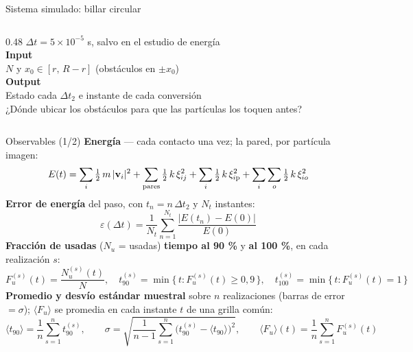 \begin{frame}{Sistema simulado: billar circular}
\begin{columns}[c]
\begin{column}{0.48\textwidth}
{      $\Delta t = 5\times10^{-5}$ s, salvo en el estudio de energía\\[5pt]
      \textbf{Input}\\[2pt]
      $N$ y $x_0 \in [r,\, R - r]$ (obstáculos en $\pm x_0$)\\[5pt]
      \textbf{Output}\\[2pt]
      Estado cada $\Delta t_2$ e instante de cada conversión\\[5pt]
      ¿Dónde ubicar los obstáculos para que las partículas los toquen antes?
      }
    \end{column}
  \end{columns}
\end{frame}

\begin{frame}{Observables (1/2)}
  \footnotesize
  \abovedisplayskip=0pt \belowdisplayskip=0pt
  \abovedisplayshortskip=0pt \belowdisplayshortskip=0pt
  \textbf{Energía} --- cada contacto una vez; la pared, por partícula imagen:
  \[
    E(t) = \sum_i \tfrac{1}{2}\,m\,|\mathbf{v}_i|^2 + \sum_{\text{pares}} \tfrac{1}{2}\,k\,\xi_{ij}^2
         + \sum_i \tfrac{1}{2}\,k\,\xi_{i\mathrm{p}}^2 + \sum_i \sum_o \tfrac{1}{2}\,k\,\xi_{io}^2
  \]
  \textbf{Error de energía} del paso, con $t_n = n\,\Delta t_2$ y $N_t$ instantes:
  \[
    \varepsilon(\Delta t) = \frac{1}{N_t} \sum_{n=1}^{N_t} \frac{|E(t_n) - E(0)|}{E(0)}
  \]
  \textbf{Fracción de usadas} ($N_u$ = usadas) \textbf{tiempo al 90 \%} y \textbf{al 100 \%}, en cada realización $s$:
  \[
    F_u^{(s)}(t) = \frac{N_u^{(s)}(t)}{N},
    \quad
    t_{90}^{(s)} = \min\big\{\, t : F_u^{(s)}(t) \geq 0{,}9 \,\big\},
    \quad
    t_{100}^{(s)} = \min\big\{\, t : F_u^{(s)}(t) = 1 \,\big\}
  \]
  \textbf{Promedio y desvío estándar muestral} sobre $n$ realizaciones (barras de error $= \sigma$); $\langle F_u \rangle$ se promedia en cada instante $t$ de una grilla común:
  \[
    \langle t_{90} \rangle = \frac{1}{n} \sum_{s=1}^{n} t_{90}^{(s)},
    \qquad
    \sigma = \sqrt{\frac{1}{n - 1} \sum_{s=1}^{n} \big( t_{90}^{(s)} - \langle t_{90} \rangle \big)^2},
    \qquad
    \langle F_u \rangle(t) = \frac{1}{n} \sum_{s=1}^{n} F_u^{(s)}(t)
  \]
\end{frame}

